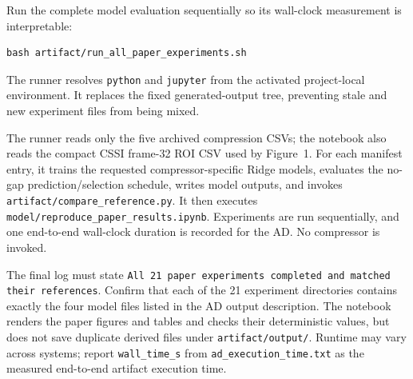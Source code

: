\artin
Run the complete model evaluation sequentially so its wall-clock measurement is
interpretable:
\begin{verbatim}
bash artifact/run_all_paper_experiments.sh
\end{verbatim}
The runner resolves \texttt{python} and \texttt{jupyter} from the activated
project-local environment. It replaces the fixed generated-output tree, preventing
stale and new experiment files from being mixed.

\artcomp
The runner reads only the five archived compression CSVs; the notebook also
reads the compact CSSI frame-32 ROI CSV used by Figure~1. For each manifest
entry, it trains the requested compressor-specific Ridge models, evaluates the
no-gap prediction/selection schedule, writes model outputs, and invokes
\texttt{artifact/compare\_reference.py}. It then executes
\texttt{model/reproduce\_paper\_results.ipynb}. Experiments are run
sequentially, and one end-to-end wall-clock duration is recorded for the AD.
No compressor is invoked.

\artout
The final log must state
\texttt{All 21 paper experiments completed and matched their references}.
Confirm that each of the 21 experiment directories contains exactly the four
model files listed in the AD output description. The notebook renders the paper
figures and tables and checks their deterministic values, but does not save
duplicate derived files under \texttt{artifact/output/}. Runtime may vary
across systems; report
\texttt{wall\_time\_s} from \texttt{ad\_execution\_time.txt} as the measured
end-to-end artifact execution time.
